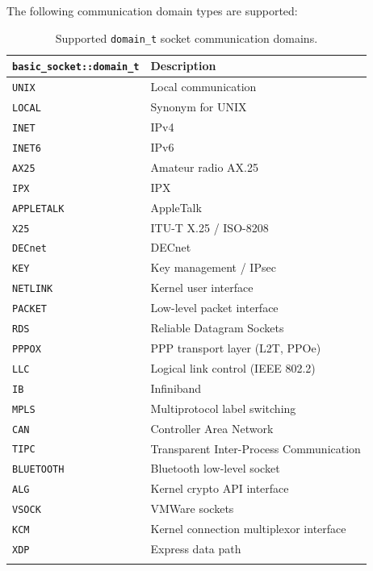 \documentclass[10pt,a4paper,openany]{mudbook}
\begin{document}
The following communication domain types are supported:
\begin{longtable}{l|p{}}
  \textbf{\texttt{basic\_socket::domain\_t}} & \textbf{Description}  \\
  \hline
  \texttt{UNIX} & Local communication  \\
  \texttt{LOCAL} & Synonym for UNIX  \\
  \texttt{INET} & IPv4  \\
  \texttt{INET6} & IPv6  \\
  \texttt{AX25} & Amateur radio AX.25  \\
  \texttt{IPX} & IPX  \\
  \texttt{APPLETALK} & AppleTalk  \\
  \texttt{X25} & ITU-T X.25 / ISO-8208  \\
  \texttt{DECnet} & DECnet  \\
  \texttt{KEY} & Key management / IPsec  \\
  \texttt{NETLINK} & Kernel user interface  \\
  \texttt{PACKET} & Low-level packet interface  \\
  \texttt{RDS} & Reliable Datagram Sockets  \\
  \texttt{PPPOX} & PPP transport layer (L2T, PPOe)  \\
  \texttt{LLC} & Logical link control (IEEE 802.2)  \\
  \texttt{IB} & Infiniband  \\
  \texttt{MPLS} & Multiprotocol label switching  \\
  \texttt{CAN} & Controller Area Network  \\
  \texttt{TIPC} & Transparent Inter-Process Communication  \\
  \texttt{BLUETOOTH} & Bluetooth low-level socket  \\
  \texttt{ALG} & Kernel crypto API interface  \\
  \texttt{VSOCK} & VMWare sockets  \\
  \texttt{KCM} & Kernel connection multiplexor interface  \\
  \texttt{XDP} & Express data path  \\
  \caption{Supported \texttt{domain\_t} socket communication domains.}
  \label{tbl:domain_t}
\end{longtable}
\end{document}
